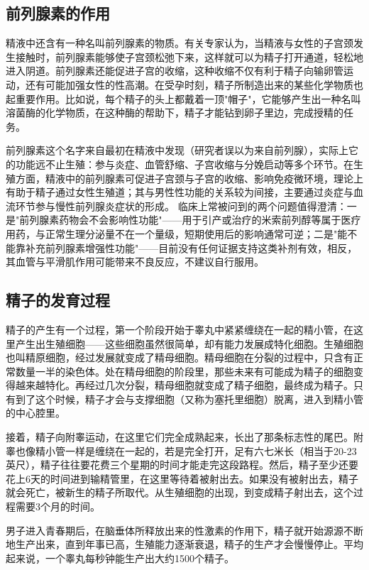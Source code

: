 \documentclass[12pt,a4paper,twoside]{ctexbook}
\begin{document}
\subsection{前列腺素的作用}

精液中还含有一种名叫前列腺素的物质。有关专家认为，当精液与女性的子宫颈发生接触时，前列腺素能够使子宫颈松弛下来，这样就可以为精子打开通道，轻松地进入阴道。前列腺素还能促进子宫的收缩，这种收缩不仅有利于精子向输卵管运动，还有可能加强女性的性高潮。在受孕时刻，精子所制造出来的某些化学物质也起重要作用。比如说，每个精子的头上都戴着一顶"帽子"，它能够产生出一种名叫溶菌酶的化学物质，在这种酶的帮助下，精子才能钻到卵子里边，完成授精的任务。


前列腺素这个名字来自最初在精液中发现（研究者误以为来自前列腺），实际上它的功能远不止生殖：参与炎症、血管舒缩、子宫收缩与分娩启动等多个环节。在生殖方面，精液中的前列腺素可促进子宫颈与子宫的收缩、影响免疫微环境，理论上有助于精子通过女性生殖道；其与男性性功能的关系较为间接，主要通过炎症与血流环节参与慢性前列腺炎症状的形成。
临床上常被问到的两个问题值得澄清：一是"前列腺素药物会不会影响性功能"——用于引产或治疗的米索前列醇等属于医疗用药，与正常生理分泌量不在一个量级，短期使用后的影响通常可逆；二是"能不能靠补充前列腺素增强性功能"——目前没有任何证据支持这类补剂有效，相反，其血管与平滑肌作用可能带来不良反应，不建议自行服用。

\subsection{精子的发育过程}

精子的产生有一个过程，第一个阶段开始于睾丸中紧紧缠绕在一起的精小管，在这里产生出生殖细胞——这些细胞虽然很简单，却有能力发展成特化细胞。生殖细胞也叫精原细胞，经过发展就变成了精母细胞。精母细胞在分裂的过程中，只含有正常数量一半的染色体。处在精母细胞的阶段里，那些未来有可能成为精子的细胞变得越来越特化。再经过几次分裂，精母细胞就变成了精子细胞，最终成为精子。只有到了这个时候，精子才会与支撑细胞（又称为塞托里细胞）脱离，进入到精小管的中心腔里。

接着，精子向附睾运动，在这里它们完全成熟起来，长出了那条标志性的尾巴。附睾也像精小管一样是缠绕在一起的，若是完全打开，足有六七米长（相当于20-23英尺），精子往往要花费三个星期的时间才能走完这段路程。然后，精子至少还要花上6天的时间进到输精管里，在这里等待着被射出去。如果没有被射出去，精子就会死亡，被新生的精子所取代。从生殖细胞的出现，到变成精子射出去，这个过程需要3个月的时间。

男子进入青春期后，在脑垂体所释放出来的性激素的作用下，精子就开始源源不断地生产出来，直到年事已高，生殖能力逐渐衰退，精子的生产才会慢慢停止。平均起来说，一个睾丸每秒钟能生产出大约1500个精子。
\end{document}

